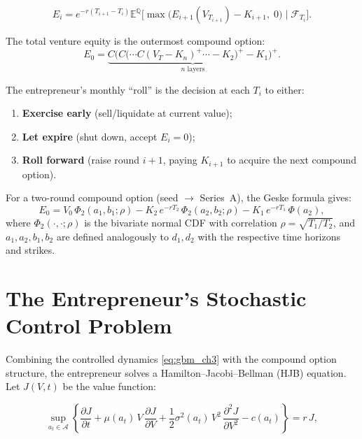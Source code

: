 \documentclass[12pt,a4paper,oneside]{book}
\theoremstyle{definition}
\theoremstyle{remark}
\newcommand{\E}{\mathbb{E}}
\newcommand{\F}{\mathcal{F}}
\begin{document}
\begin{equation}\label{eq:compound}
  E_i = e^{-r(T_{i+1}-T_i)}
    \E^{\mathbb{Q}}\bigl[\max\bigl(E_{i+1}(V_{T_{i+1}}) - K_{i+1},\;0\bigr)
    \;\big|\;\F_{T_i}\bigr].
\end{equation}

The total venture equity is the outermost compound option:
\begin{equation}\label{eq:total_compound}
  E_0 = \underbrace{C\bigl(C\bigl(\cdots C(V_T - K_n)^+
    \cdots - K_2\bigr)^+ - K_1\bigr)^+}_{n \text{ layers}}.
\end{equation}

The entrepreneur's monthly ``roll'' is the decision at each $T_i$ to either:
\begin{enumerate}[nosep]
  \item \textbf{Exercise early} (sell/liquidate at current value);
  \item \textbf{Let expire} (shut down, accept $E_i = 0$);
  \item \textbf{Roll forward} (raise round $i+1$, paying $K_{i+1}$ to acquire
    the next compound option).
\end{enumerate}

For a two-round compound option (seed $\to$ Series~A), the Geske formula gives:
\begin{equation}\label{eq:geske}
  E_0 = V_0\,\Phi_2(a_1, b_1; \rho)
    - K_2\,e^{-rT_2}\,\Phi_2(a_2, b_2; \rho)
    - K_1\,e^{-rT_1}\,\Phi(a_2),
\end{equation}
where $\Phi_2(\cdot,\cdot;\rho)$ is the bivariate normal CDF with
correlation $\rho = \sqrt{T_1/T_2}$, and $a_1, a_2, b_1, b_2$ are defined
analogously to $d_1, d_2$ with the respective time horizons and strikes.

\section{The Entrepreneur's Stochastic Control Problem}

Combining the controlled dynamics \eqref{eq:gbm_ch3} with the compound option
structure, the entrepreneur solves a Hamilton--Jacobi--Bellman (HJB) equation.
Let $J(V,t)$ be the value function:

\begin{equation}\label{eq:hjb}
  \sup_{a_t \in \mathcal{A}} \left\{
    \frac{\partial J}{\partial t}
    + \mu(a_t)\,V\,\frac{\partial J}{\partial V}
    + \frac{1}{2}\sigma^2(a_t)\,V^2\,
      \frac{\partial^2 J}{\partial V^2}
    - c(a_t)
  \right\} = r\,J,
\end{equation}
\end{document}
